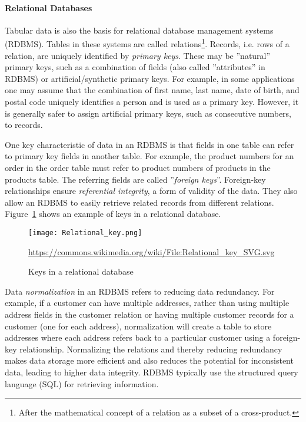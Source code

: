 \paragraph*{Relational Databases}

Tabular data is also the basis for relational database management systems (RDBMS). Tables in these systems are called relations\footnote{After the mathematical concept of a relation as a subset of a cross-product.}. Records, i.e. rows of a relation, are uniquely identified by \emph{primary keys}. These may be ''natural'' primary keys, such as a combination of fields (also called ''attributes'' in RDBMS) or artificial/synthetic primary keys. For example, in some applications one may assume that the combination of first name, last name, date of birth, and postal code uniquely identifies a person and is used as a primary key. However, it is generally safer to assign artificial primary keys, such as consecutive numbers, to records. 

One key characteristic of data in an RDBMS is that fields in one table can refer to primary key fields in another table. For example, the product numbers for an order in the order table must refer to product numbers of products in the products table. The referring fields are called ''\emph{foreign keys}''. Foreign-key relationships ensure \emph{referential integrity}, a form of validity of the data. They also allow an RDBMS to easily retrieve related records from different relations. Figure~\ref{fig:relationkeys} shows an example of keys in a relational database.

\begin{figure}
\centering
\texttt{[image: Relational\_key.png]}

\scriptsize{\url{https://commons.wikimedia.org/wiki/File:Relational_key_SVG.svg}}
\caption{Keys in a relational database}
\label{fig:relationkeys}
\end{figure}

Data \emph{normalization} in an RDBMS refers to reducing data redundancy. For example, if a customer can have multiple addresses, rather than using multiple address fields in the customer relation or having multiple customer records for a customer (one for each address), normalization will create a table to store addresses where each address refers back to a particular customer using a foreign-key relationship. Normalizing the relations and thereby reducing redundancy makes data storage more efficient and also reduces the potential for inconsistent data, leading to higher data integrity. RDBMS typically use the structured query language (SQL) for retrieving information. 

